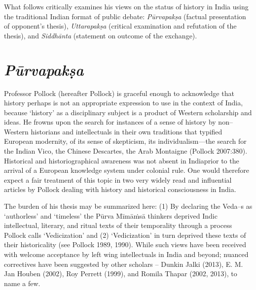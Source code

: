 What follows critically examines his views on the status of history in India using the traditional Indian format of public debate: \textit{Pūrvapakṣa} (factual presentation of opponent’s thesis), \textit{Uttarapakṣa} (critical examination and refutation of the thesis), and \textit{Siddhānta} (statement on outcome of the exchange).


\section*{\textit{Pūrvapakṣa}}

Professor Pollock (hereafter Pollock) is graceful enough to acknowledge that history perhaps is not an appropriate expression to use in the context of India, because ‘history’ as a disciplinary subject is a product of Western scholarship and ideas. He frowns upon the search for instances of a sense of history by non–Western historians and intellectuals in their own traditions that typified European modernity, of its sense of skepticism, its individualism—the search for the Indian Vico, the Chinese Descartes, the Arab Montaigne (Pollock 2007:380). Historical and historiographical awareness was not absent in India\break prior to the arrival of a European knowledge system under colonial rule. One would therefore expect a fair treatment of this topic in two very widely read and influential articles by Pollock dealing with history and historical consciousness in India.

The burden of his thesis may be summarized here: (1) By declaring the Veda–s as ‘authorless’ and ‘timeless’ the Pūrva Mīmāṁsā thinkers deprived Indic intellectual, literary, and ritual texts of their temporality through a process Pollock calls ‘Vedicization’ and (2) ‘Vedicization’ in turn deprived these texts of their historicality (see Pollock 1989, 1990). While such views have been received with welcome acceptance by left wing intellectuals in India and beyond; nuanced correctives have been suggested by other scholars – Dunkin Jalki (2013), E. M. Jan Houben (2002), Roy Perrett (1999), and Romila Thapar (2002, 2013), to name a few.

